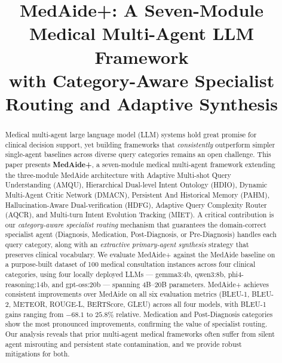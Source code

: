 \documentclass[conference]{IEEEtran}
\begin{document}
\title{MedAide+: A Seven-Module Medical Multi-Agent LLM Framework\\
with Category-Aware Specialist Routing and Adaptive Synthesis}

\author{
}

\maketitle

\begin{abstract}
Medical multi-agent large language model (LLM) systems hold great promise for clinical
decision support, yet building frameworks that \emph{consistently} outperform simpler
single-agent baselines across diverse query categories remains an open challenge. This
paper presents \textbf{MedAide+}, a seven-module medical multi-agent framework extending
the three-module MedAide architecture with Adaptive Multi-shot Query Understanding
(AMQU), Hierarchical Dual-level Intent Ontology (HDIO), Dynamic Multi-Agent Critic
Network (DMACN), Persistent And Historical Memory (PAHM), Hallucination-Aware
Dual-verification (HDFG), Adaptive Query Complexity Router (AQCR), and Multi-turn
Intent Evolution Tracking (MIET). A critical contribution is our \emph{category-aware
specialist routing} mechanism that guarantees the domain-correct specialist agent
(Diagnosis, Medication, Post-Diagnosis, or Pre-Diagnosis) handles each query category,
along with an \emph{extractive primary-agent synthesis} strategy that preserves clinical
vocabulary. We evaluate MedAide+ against the MedAide baseline on a purpose-built dataset
of 100 medical consultation instances across four clinical categories, using four locally
deployed LLMs — gemma3:4b, qwen3:8b, phi4-reasoning:14b, and gpt-oss:20b — spanning
4B–20B parameters. MedAide+ achieves consistent improvements over MedAide on all six
evaluation metrics (BLEU-1, BLEU-2, METEOR, ROUGE-L, BERTScore, GLEU) across all
four models, with BLEU-1 gains ranging from $-68.1$ to $25.8\%$ relative. Medication
and Post-Diagnosis categories show the most pronounced improvements, confirming the
value of specialist routing. Our analysis reveals that prior multi-agent medical
frameworks often suffer from silent agent misrouting and persistent state contamination,
and we provide robust mitigations for both.
\end{abstract}
\end{document}
